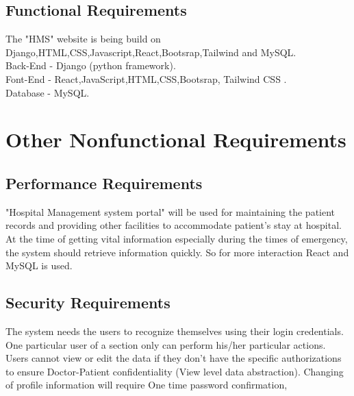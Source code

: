 \documentclass{scrreprt}
\begin{document}
\section{Functional Requirements}
The "HMS" website is being build on Django,HTML,CSS,Javascript,React,Bootsrap,Tailwind and MySQL.\\
\newline
Back-End - Django (python framework).\\
\newline
Font-End - React,JavaScript,HTML,CSS,Bootsrap, Tailwind CSS .\\
\newline
Database -  MySQL.

\chapter{Other Nonfunctional Requirements}

\section{Performance Requirements}
"Hospital Management system portal" will be used for maintaining the patient records and providing other facilities to accommodate patient's stay at hospital. 
\newline
At the time of getting vital information especially during the times of emergency, the system should retrieve information quickly.
So for more interaction React and MySQL is used. 

\section{Security Requirements}
The system needs the users to recognize themselves using their login credentials.
One particular user of a section only can perform his/her particular actions.
\newline
Users cannot view or edit the data if they don’t have the specific authorizations to ensure Doctor-Patient confidentiality (View level data abstraction).
\newline
Changing of profile information will require One time password confirmation,
\end{document}
